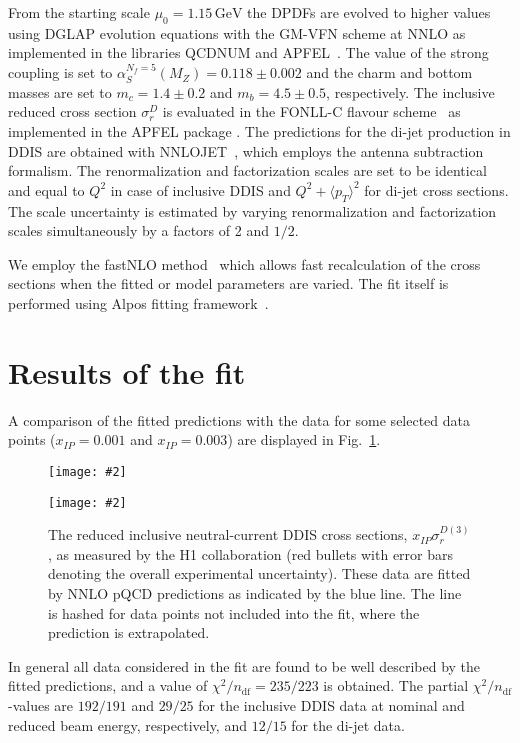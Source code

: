 \documentclass{PoS}
\newcommand{\IP}{I\!\!P}
\newcommand{\GeV}{\ensuremath{\mathrm{GeV}}\xspace}
\newcommand{\includegraphicss}[2][]{\texttt{[image: \#2]}}
\begin{document}
From the starting scale $\mu_0 = 1.15\,\GeV$ the DPDFs are evolved to higher values using DGLAP evolution equations with the GM-VFN scheme at NNLO as implemented in the libraries QCDNUM and APFEL~\cite{Botje:2010ay,Bertone:2013vaa}.
The value of the strong coupling is set to $\alpha_S^{N_f = 5} (M_Z) = 0.118\pm 0.002$ and the charm and bottom masses are set to $m_c = 1.4\pm 0.2$ and $m_b = 4.5\pm 0.5$, respectively.
The inclusive reduced cross section $\sigma_r^D$ is evaluated in the \mbox{FONLL-C} flavour scheme~\cite{Cacciari:1998it} as implemented in the APFEL package \cite{Bertone:2013vaa}.
The predictions for the di-jet production in DDIS are obtained with NNLOJET~\cite{Currie:2016ytq}, which employs the antenna subtraction formalism.
The renormalization and factorization scales are set to be identical and equal to $Q^2$ in case of inclusive DDIS and $Q^2 + \langle p_T\rangle^2$ for di-jet cross sections.
The scale uncertainty is estimated by varying renormalization and factorization scales simultaneously by a factors of 2 and $1/2$.

We employ the fastNLO method~\cite{Britzger:2012bs} which allows fast recalculation of the cross sections when the fitted or model parameters are varied.
The fit itself is performed using Alpos fitting framework~\cite{alpos}.


\section{Results of the fit}

A comparison of the fitted predictions with the data for some selected data points ($x_{\IP} = 0.001$ and $x_{\IP} = 0.003$) are displayed in Fig.~\ref{figDDISfit}.
\begin{figure}[tbhp]
\centering
\begin{minipage}[t]{0.47\textwidth}
\includegraphicss[trim={0cm 0.0cm 0 0.0cm},clip,width=.9\textwidth]{{{plots/H1prelim-19-013.fig11}}}
\end{minipage}
\begin{minipage}[t]{0.47\textwidth}
\includegraphicss[trim={0cm 1.2cm 0 1.1cm},clip,width=.9\textwidth]{{{plots/H1prelim-19-013.fig10}}}
\end{minipage}
\caption{The reduced inclusive neutral-current DDIS cross sections, $x_{\IP}\sigma_r^{D(3)}$, as measured by the H1 collaboration (red bullets with error bars denoting the overall experimental uncertainty). These data are fitted by NNLO pQCD predictions as indicated by the blue line. The line is hashed for data points not included into the fit, where the prediction is extrapolated.}
\label{figDDISfit}
\end{figure}
In general all data considered in the fit are found to be well described by the fitted predictions, and
a value of $\chi^2/n_\mathrm{df} = 235/223$ is obtained.
The partial $\chi^2/n_\mathrm{df}$-values are $192/191$  and $29/25$ for the inclusive DDIS data at nominal and reduced beam energy, respectively, and $12/15$ for the di-jet data.
\end{document}
